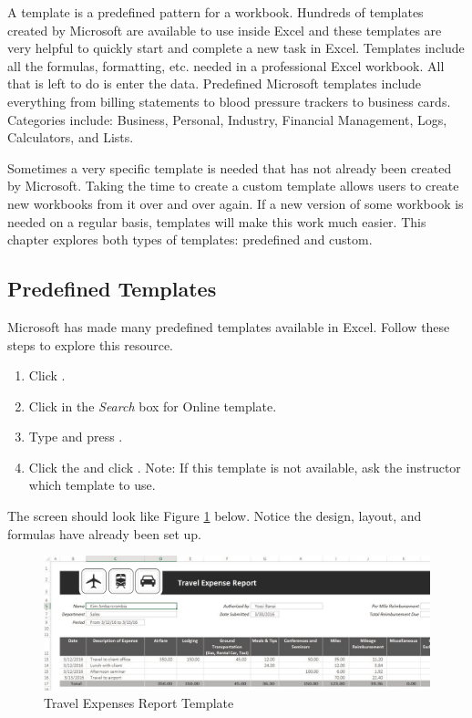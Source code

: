 A template is a predefined pattern for a workbook. Hundreds of templates created by Microsoft are available to use inside Excel and these templates are very helpful to quickly start and complete a new task in Excel. Templates include all the formulas, formatting, etc. needed in a professional Excel workbook. All that is left to do is enter the data. Predefined Microsoft templates include everything from billing statements to blood pressure trackers to business cards. Categories include: Business, Personal, Industry, Financial Management, Logs, Calculators, and Lists.

Sometimes a very specific template is needed that has not already been created by Microsoft. Taking the time to create a custom template allows users to create new workbooks from it over and over again. If a new version of some workbook is needed on a regular basis, templates will make this work much easier. This chapter explores both types of templates: predefined and custom.

\subsection{Predefined Templates}

Microsoft has made many predefined templates available in Excel. Follow these steps to explore this resource.

\begin{enumerate}
	\item Click .
	\item Click in the \textit{Search} box for Online template.
	\item Type  and press .
	\item Click the  and click . Note: If this template is not available, ask the instructor which template to use.
\end{enumerate}

The screen should look like Figure \ref{06:fig09} below. Notice the design, layout, and formulas have already been set up.

\begin{figure}[H]
	\centering
	\includegraphics[width=\maxwidth{.95\linewidth}]{gfx/ch06_fig09}
	\caption{Travel Expenses Report Template}
	\label{06:fig09}
\end{figure}


